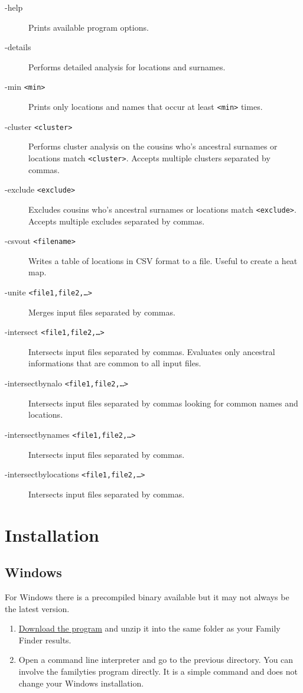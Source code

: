 \documentclass[12pt,a4paper]{article}
\begin{document}
\begin{description}
\item[-help] Prints available program options.
\item[-details] Performs detailed analysis for locations
  and surnames.
\item[-min \texttt{<min>}] Prints only locations and names that occur at
  least \texttt{<min>} times.
\item[-cluster \texttt{<cluster>}] Performs cluster analysis on the cousins
  who's ancestral surnames or locations match \texttt{<cluster>}.
  Accepts multiple clusters separated by commas.
\item[-exclude \texttt{<exclude>}] Excludes cousins who's ancestral surnames or
  locations match \texttt{<exclude>}.
  Accepts multiple excludes separated by commas.
\item[-csvout \texttt{<filename>}] Writes a table of locations in CSV format
  to a file. Useful to create a heat map.
\item[-unite \texttt{<file1,file2,\dots>}]
  Merges input files separated by commas.
\item[-intersect \texttt{<file1,file2,\dots>}]
  Intersects input files separated by commas.
  Evaluates only ancestral informations that are common to all input files.
\item[-intersectbynalo \texttt{<file1,file2,\dots>}]
  Intersects input files separated by commas looking for common names and locations.
\item[-intersectbynames \texttt{<file1,file2,\dots>}]
  Intersects input files separated by commas.
\item[-intersectbylocations \texttt{<file1,file2,\dots>}]
  Intersects input files separated by commas.
\end{description}


\section{Installation}

\subsection{Windows}
For Windows there is a precompiled binary available but it
may not always be the latest version.
\begin{enumerate}
\item \href{http://www.projectory.de/genetics/familyties.zip}
  {Download the program} and unzip it into the same folder
  as your Family Finder results.
\item Open a command line interpreter and go to the previous
  directory. You can involve the familyties program directly.
  It is a simple command and does not change your Windows
  installation.
\end{enumerate}
\end{document}
